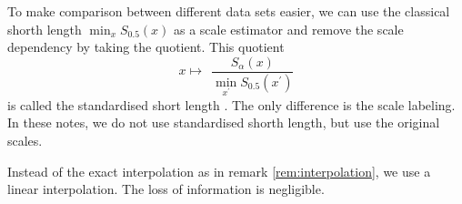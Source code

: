 \documentclass[dvips,12pt,a4paper,twoside]{amsart}
\begin{document}
To make comparison between different data sets easier, we can use the classical shorth length $\min_x S_{0.5}(x)$ as a scale estimator and remove the scale dependency by taking the quotient. This quotient
$$x \mapsto\  \ \frac{S_{\alpha}(x)}{\min_{x^\prime} S_{0.5}(x^\prime)}$$
is called the  standardised short length .
The only difference is the scale labeling.
In these notes, we do not use standardised shorth length, but use the original scales.


Instead of the exact interpolation
as in remark \ref{rem:interpolation}, we use a linear interpolation. The loss of information is negligible. 
\end{document}

